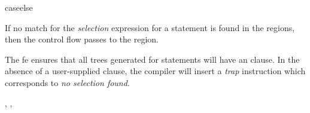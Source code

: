 \begin{instruction}{caseelse}

  \begin{notes}
    If no match for the \emph{selection} expression for a 
    statement is found in the  regions, then the
    control flow passes to the  region.

    The \ac{fe} ensures that all trees generated for 
    statements will have an  clause.  In the absence of a
    user-supplied  clause, the compiler will insert a
    \emph{trap} instruction which corresponds to \emph{no selection
      found}.
  \end{notes}

  \nresults

  \begin{operands}
  \item {}
  \end{operands}

  \begin{seealso}
    , ,
  \end{seealso}
\end{instruction}


